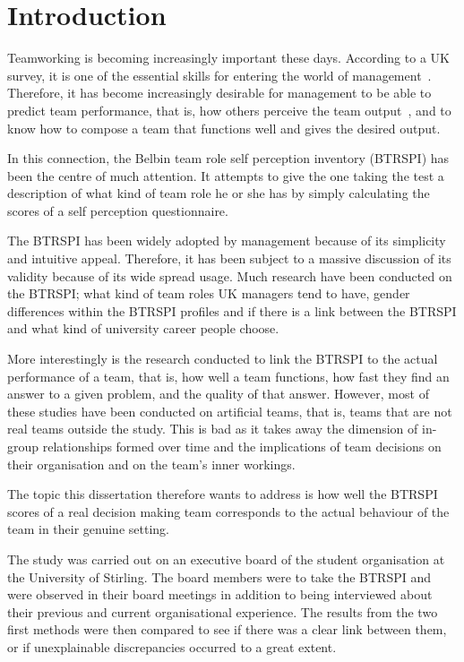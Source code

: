 \documentclass[a4paper,12pt,titlepage]{report}
\begin{document}
  \tableofcontents

  \chapter{Introduction}
  Teamworking is becoming increasingly important these days. According to a UK
  survey, it is one of the essential skills for entering the world of
  management~\cite[61]{sfwmgs}. Therefore, it has become increasingly desirable
  for management to be able to predict team performance, that is, how others
  perceive the team output~\cite[399]{ahdb}, and to know how to
  compose a team that functions well and gives the desired output.

  In this connection, the Belbin team role self perception inventory (BTRSPI)
  has been the centre of much attention. It attempts to give the one taking the test
  a description of what kind of team role he or she has by simply calculating
  the scores of a  self perception questionnaire.

  The BTRSPI has been widely adopted by management because of its simplicity and
  intuitive appeal. Therefore, it has been subject to a massive discussion of its
  validity because of its wide spread usage. Much research have been conducted on
  the BTRSPI; what kind of team roles UK managers tend to have, gender differences
  within the BTRSPI profiles and if there is a link between the BTRSPI and
  what kind of university career people choose.

  More interestingly is the research conducted to link the BTRSPI to the
  actual performance of a team, that is, how well a team functions,
  how fast they find an answer to a given problem, and the quality of that
  answer. However, most of these studies have been conducted on artificial teams,
  that is, teams that are not real teams outside the study. This is bad as it
  takes away the dimension of in-group relationships formed over time and the
  implications of team decisions on their organisation and on the team's inner
  workings.

  The topic this dissertation therefore wants to address is how well
  the BTRSPI scores of a real decision making team corresponds to the
  actual behaviour of the team in their genuine setting.

  The study was carried out on an executive board of the student organisation
  at the University of Stirling. The board members were to take the BTRSPI and were
  observed in their board meetings in addition to being interviewed about their
  previous and current organisational experience. The results from the two first 
  methods were then compared to see if there was a clear link between them,
  or if unexplainable discrepancies occurred to a great extent.
\end{document}
